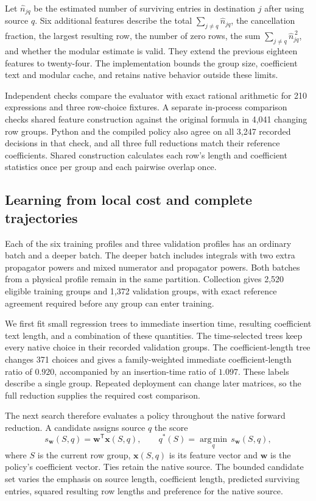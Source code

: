 Let $\widehat n_{jq}$ be the estimated number of surviving entries in
destination $j$ after using source $q$. Six additional features describe the
total $\sum_{j\ne q}\widehat n_{jq}$, the cancellation fraction, the largest
resulting row, the number of zero rows, the sum
$\sum_{j\ne q}\widehat n_{jq}^{\,2}$, and whether the modular estimate is valid.
They extend the previous eighteen features to twenty-four. The implementation
bounds the group size, coefficient text and modular cache, and retains native
behavior outside these limits.

Independent checks compare the evaluator with exact rational arithmetic for
210 expressions and three row-choice fixtures. A separate in-process comparison
checks shared feature construction against the original formula in 4,041
changing row groups. Python and the compiled policy also agree on all 3,247
recorded decisions in that check, and all three full reductions match their
reference coefficients. Shared construction calculates each row's length and
coefficient statistics once per group and each pairwise overlap once.

\subsection{Learning from local cost and complete trajectories}
Each of the six training profiles and three validation profiles has an ordinary
batch and a deeper batch. The deeper batch includes integrals with two extra
propagator powers and mixed numerator and propagator powers. Both batches from
a physical profile remain in the same partition. Collection gives 2,520
eligible training groups and 1,372 validation groups, with exact reference
agreement required before any group can enter training.

We first fit small regression trees to immediate insertion time, resulting
coefficient text length, and a combination of these quantities. The
time-selected trees keep every native choice in their recorded validation
groups. The coefficient-length tree changes 371 choices and gives a
family-weighted immediate coefficient-length ratio of $0.920$, accompanied by
an insertion-time ratio of $1.097$. These labels describe a single group.
Repeated deployment can change later matrices, so the full reduction supplies
the required cost comparison.

The next search therefore evaluates a policy throughout the native forward
reduction. A candidate assigns source $q$ the score
\[
 s_{\boldsymbol w}(S,q)=\boldsymbol w^{\mathsf T}\boldsymbol x(S,q),
 \qquad
 q^*(S)=\underset{q}{\operatorname{arg\,min}}\,
             s_{\boldsymbol w}(S,q),
\]
where $S$ is the current row group, $\boldsymbol x(S,q)$ is its feature vector
and $\boldsymbol w$ is the policy's coefficient vector. Ties retain the native
source. The bounded candidate set varies the emphasis on source length,
coefficient length, predicted surviving entries, squared resulting row lengths
and preference for the native source.


